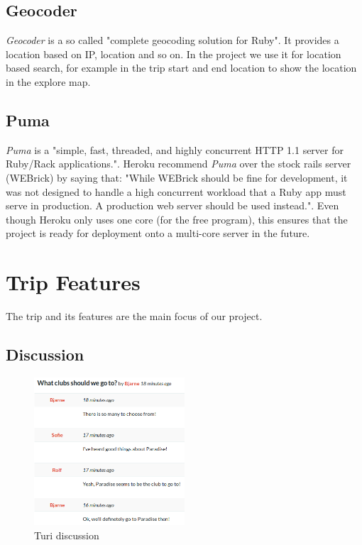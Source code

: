 \documentclass[a4paper]{article}
\begin{document}
\subsection{Geocoder}
\textit{Geocoder} is a so called "complete geocoding solution for Ruby"\cite{geocoder}. It provides a location based on IP, location and so on. In the project we use it for location based search, for example in the trip start and end location to show the location in the explore map. 

\subsection{Puma}
\textit{Puma} is a "simple, fast, threaded, and highly concurrent HTTP 1.1 server for Ruby/Rack applications."\cite{puma}. Heroku recommend \textit{Puma} over the stock rails server (WEBrick) by saying that: "While WEBrick should be fine for development, it was not designed to handle a high concurrent workload that a Ruby app must serve in production. A production web server should be used instead."\cite{heroku_webserver}. Even though Heroku only uses one core (for the free program), this ensures that the project is ready for deployment onto a multi-core server in the future.  


\section{Trip Features}
The trip and its features are the main focus of our project. 
\subsection{Discussion}

\begin{figure}[!h]
  \begin{center}
    \vspace{-0pt}
    \includegraphics[width=0.5\textwidth]{pictures/discussion}
  \end{center}
\caption{Turi discussion}
\label{fig:discussion}
\end{figure}
\end{document}
